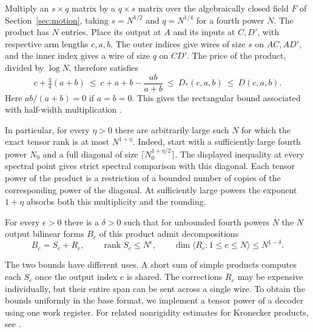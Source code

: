 Multiply an \(s\times q\) matrix by a \(q\times s\) matrix over the
algebraically closed field \(F\) of Section~\ref{sec:motion}, taking
\(s=N^{1/2}\) and \(q=N^{1/4}\) for a fourth power \(N\). The product
has \(N\) entries. Place its output at \(A\) and its inputs at
\(C,D'\), with respective arm lengths \(c,a,b\). The outer indices
give wires of size \(s\) on \(AC,AD'\), and the inner index gives a wire
of size \(q\) on \(CD'\). The price of the product, divided by
\(\log N\), therefore satisfies
\[
   c+\tfrac34(a+b)
   \ \le\ c+a+b-\frac{ab}{a+b}
   \ \le\ D_*(c,a,b)\ \le\ D(c,a,b).
\]
Here \(ab/(a+b)=0\) if \(a=b=0\). This gives the rectangular bound
associated with half-width multiplication \cite{uznanski,abvz}.

In particular, for every \(\eta>0\) there are arbitrarily large
such \(N\) for which the exact tensor rank is at most \(N^{1+\eta}\).
Indeed, start with a sufficiently large fourth power \(N_0\)
and a full diagonal of size \(\lceil N_0^{1+\eta/2}\rceil\).
The displayed inequality at every spectral point gives strict
spectral comparison with this diagonal. Each tensor power of the product
is a restriction of a bounded number of copies of the corresponding
power of the diagonal. At sufficiently large powers the exponent
\(1+\eta\) absorbs both this multiplicity and the rounding.

\begin{lemma}\label{lem:secondary}
For every \(\epsilon>0\) there is a \(\delta>0\) such that for
unbounded fourth powers \(N\) the \(N\) output bilinear forms \(B_e\)
of this product admit decompositions
\[
    B_e=S_e+R_e,\qquad
    \operatorname{rank}S_e\le N^\epsilon,\qquad
    \dim\langle R_e:1\le e\le N\rangle\le N^{1-\delta}.
\]
\end{lemma}

The two bounds have different uses. A short sum of simple products
computes each \(S_e\) once the output index \(e\) is shared.
The corrections \(R_e\) may be expensive individually, but their
entire span can be sent across a single wire. To obtain the bounds
uniformly in the base format, we implement a tensor power of a decoder
using one work register. For related nonrigidity estimates for
Kronecker products, see \cite{almanrigidity,kivva}.

